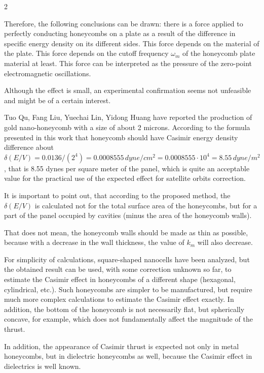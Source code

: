 \documentclass[twoside, 10pt]{article}
\begin{document}
\begin{multicols}{2}

    Therefore, the following conclusions can be drawn: there is a force applied
to perfectly conducting honeycombs on a plate as a result of the
difference in specific energy density on its different sides. This force
depends on the material of the plate. This force depends
on the cutoff frequency \(\omega_m\) of the honeycomb plate material at least.
This force can be interpreted as the pressure of the zero-point
electromagnetic oscillations.

    Although the effect is small, an experimental confirmation seems not
unfeasible and might be of a certain interest.

    Tuo Qu, Fang Liu, Yuechai Lin, Yidong Huang \cite{Tuo2019} have reported
the production of gold nano-honeycomb with a size of about 2
microns. According to the formula presented in this work that honeycomb should
have Casimir energy density difference about
\(\delta\left(E/V\right) = 0.0136/({2^4}) = 0.0008555\,dyne/cm^2 = 0.0008555 \cdot 10^4 = 8.55\,dyne/m^2\),
that is 8.55 dynes per square meter of the panel, which is quite
an acceptable value for the practical use of the expected effect for
satellite orbits correction.

    It is important to point out, that according to the proposed method,
the \(\delta\left(E/V\right)\) is
calculated not for the total surface area of the honeycombs, but for a
part of the panel occupied by cavities (minus the area of the
honeycomb walls).

    That does not mean, the honeycomb walls should be made as thin
as possible, because with a decrease in the wall thickness, the value of
\(k_m\) will also decrease.

    For simplicity of calculations, square-shaped nanocells have been analyzed,
but the obtained result can be used, with some correction unknown so far,
to estimate the Casimir effect in honeycombs of a different shape
(hexagonal, cylindrical, etc.). Such honeycombs are simpler to be manufactured,
but require much more complex calculations to estimate the Casimir effect exactly.
In addition, the bottom of the honeycomb is not necessarily flat, but
spherically concave, for example, which does not fundamentally affect
the magnitude of the thrust.

    In addition, the appearance of Casimir thrust is expected not only in metal honeycombs,
but in dielectric honeycombs as well, because the Casimir effect in dielectrics
is well known.


\end{multicols}
\end{document}

